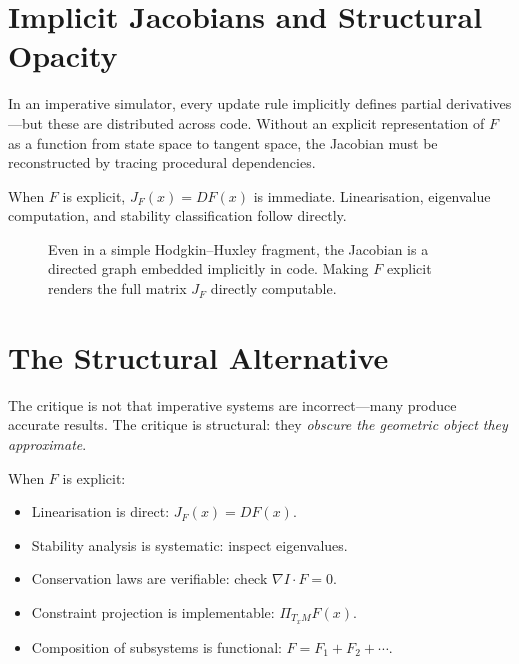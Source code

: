\documentclass[12pt,openany]{book}
\newcommand{\proj}[1]{\Pi_{#1}}
\begin{document}
\section{Implicit Jacobians and Structural Opacity}

In an imperative simulator, every update rule implicitly defines partial
derivatives—but these are distributed across code. Without an explicit
representation of $F$ as a function from state space to tangent space, the
Jacobian must be reconstructed by tracing procedural dependencies.

When $F$ is explicit, $J_F(x)=DF(x)$ is immediate. Linearisation,
eigenvalue computation, and stability classification follow directly.

\begin{figure}[H]
\centering
{}
\caption{Even in a simple Hodgkin--Huxley fragment, the Jacobian is a directed
graph embedded implicitly in code. Making $F$ explicit renders the full matrix
$J_F$ directly computable.}
\label{fig:jacobian-graph}
\end{figure}

\section{The Structural Alternative}

The critique is not that imperative systems are incorrect—many produce accurate
results. The critique is structural: they \emph{obscure the geometric object
they approximate}.

When $F$ is explicit:
\begin{itemize}[leftmargin=1.5em]
  \item Linearisation is direct: $J_F(x)=DF(x)$.
  \item Stability analysis is systematic: inspect eigenvalues.
  \item Conservation laws are verifiable: check $\nabla I\cdot F=0$.
  \item Constraint projection is implementable: $\proj{T_xM}F(x)$.
  \item Composition of subsystems is functional: $F=F_1+F_2+\cdots$.
\end{itemize}
\end{document}

